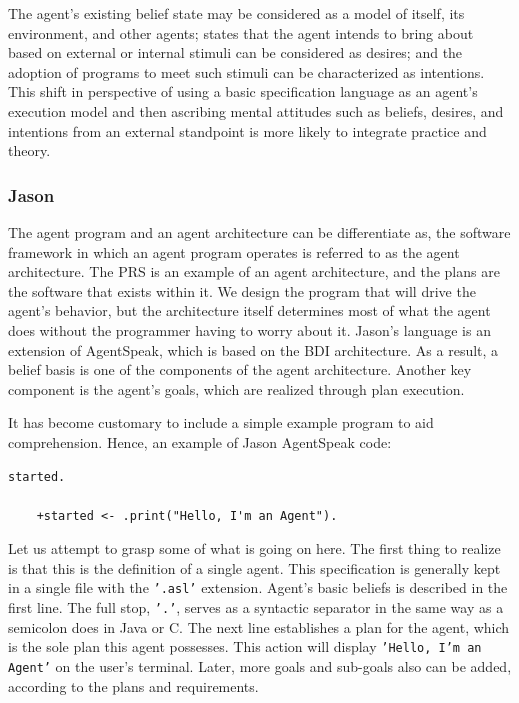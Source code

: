 The agent's existing belief state may be considered as a model of itself, its environment, and other agents; states that the agent intends to bring about based on external or internal stimuli can be considered as desires; and the adoption of programs to meet such stimuli can be characterized as intentions. This shift in perspective of using a basic specification language as an agent's execution model and then ascribing mental attitudes such as beliefs, desires, and intentions from an external standpoint is more likely to integrate practice and theory.

\subsubsection{Jason}

The agent program and an agent architecture can be differentiate as, the software framework in which an agent program operates is referred to as the agent architecture. The \ac{PRS} is an example of an agent architecture, and the plans are the software that exists within it. We design the program that will drive the agent's behavior, but the architecture itself determines most of what the agent does without the programmer having to worry about it. Jason's language is an extension of AgentSpeak, which is based on the \ac{BDI} architecture. As a result, a belief basis is one of the components of the agent architecture. Another key component is the agent's goals, which are realized through plan execution.

\vspace{.5cm}

It has become customary to include a simple example program to aid comprehension. Hence, an example of Jason AgentSpeak code:

\vspace{.5cm}

\begin{lstlisting}[backgroundcolor = \color{white}, frame=none, numbers=none]
	 started.

    +started <- .print("Hello, I'm an Agent").
\end{lstlisting}

\vspace{.5cm}

Let us attempt to grasp some of what is going on here. The first thing to realize is that this is the definition of a single agent. This specification is generally kept in a single file with the \texttt{'.asl'} extension. Agent's basic beliefs is described in the first line. The full stop, \texttt{'.'}, serves as a syntactic separator in the same way as a semicolon does in Java or C. The next line establishes a plan for the agent, which is the sole plan this agent possesses. This action will display \texttt{'Hello, I'm an Agent'} on the user's terminal. Later, more goals and sub-goals also can be added, according to the plans and requirements.

